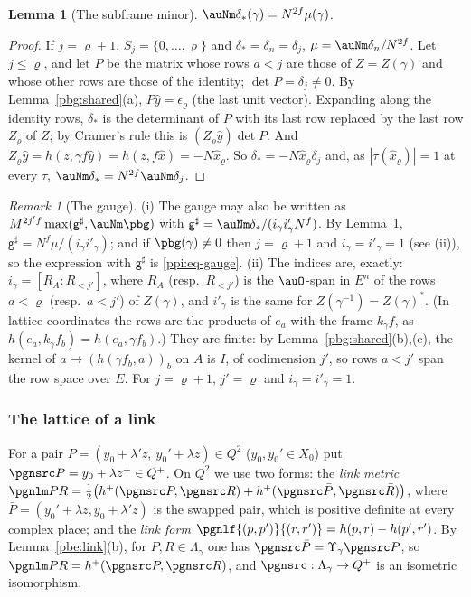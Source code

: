 \documentclass[10pt]{amsart}
\newtheorem{lemma}[theorem]{Lemma}
\theoremstyle{definition}
\theoremstyle{remark}
\newtheorem{remark}[theorem]{Remark}
\begin{document}
\begin{lemma}[The subframe minor]\label{pbg:subframe}
$\auNm\delta_*(\gamma)=N^{2f}\mu(\gamma)$.
\end{lemma}
\begin{proof}
If $j=\varrho+1$, $S_j=\{0,\dots,\varrho\}$ and $\delta_*=\delta_n=\delta_j$, $\mu=\auNm\delta_n/N^{2f}$.
Let $j\le\varrho$, and let $P$ be the matrix whose rows $a<j$ are those of $Z=Z(\gamma)$ and whose other
rows are those of the identity; $\det P=\delta_j\ne0$. By Lemma~\ref{pbg:shared}(a), $P\hat y=
\epsilon_\varrho$ (the last unit vector). Expanding along the identity rows, $\delta_*$ is the
determinant of $P$ with its last row replaced by the last row $Z_\varrho$ of $Z$; by Cramer's rule
this is $(Z_\varrho\hat y)\det P$. And $Z_\varrho\hat y=h(z,\gamma f\hat y)=h(z,f\hat x)=-N\hat x_\varrho$.
So $\delta_*=-N\hat x_\varrho\delta_j$ and, as $|\tau(\hat x_\varrho)|=1$ at every $\tau$, $\auNm\delta_*
=N^{2f}\auNm\delta_j$.
\end{proof}

\begin{remark}[The gauge]\label{pbg:rem-gauge}
(i) The gauge may also be written as $M^{2j'f}\max(\mathsf g^\sharp,\auNm\pbg)$ with $\mathsf g^\sharp=
\auNm\delta_*/(i_\gamma i'_\gamma N^f)$. By Lemma~\ref{pbg:subframe}, $\mathsf g^\sharp=N^f\mu/(i_\gamma
i'_\gamma)$; and if $\pbg(\gamma)\ne0$ then $j=\varrho+1$ and $i_\gamma=i'_\gamma=1$ (see (ii)), so the
expression with $\mathsf g^\sharp$ is \eqref{ppi:eq-gauge}. (ii) The indices are, exactly: $i_\gamma=[R_A:R_{<j'}]$, where
$R_A$ (resp.\ $R_{<j'}$) is the $\auO$-span in $E^n$ of the rows $a<\varrho$ (resp.\ $a<j'$) of
$Z(\gamma)$, and $i'_\gamma$ is the same for $Z(\gamma^{-1})=Z(\gamma)^*$. (In lattice coordinates the
rows are the products of $e_a$ with the frame $k_\gamma f$, as $h(e_a,k_\gamma f_b)=h(e_a,\gamma f_b)$.)
They are finite: by Lemma~\ref{pbg:shared}(b),(c), the kernel of $a\mapsto(h(\gamma f_b,a))_b$ on $A$ is
$I$, of codimension $j'$, so rows $a<j'$ span the row space over $E$. For $j=\varrho+1$, $j'=\varrho$
and $i_\gamma=i'_\gamma=1$.
\end{remark}

\subsubsection{The lattice of a link}\label{pbg:ss-link}

For a pair $P=(y_0+\lambda'z,\ y_0'+\lambda z)\in Q^2$ ($y_0,y_0'\in X_0$) put $\pgnsrc P=y_0+\lambda z^+
\in Q^+$. On $Q^2$ we use two forms: the \emph{link metric}
$\pgnlm PR=\tfrac12\bigl(h^+(\pgnsrc P,\pgnsrc R)+h^+(\pgnsrc\bar P,\pgnsrc\bar R)\bigr)$, where $\bar
P=(y_0'+\lambda z,y_0+\lambda'z)$ is the swapped pair, which is positive definite at every complex
place; and the \emph{link form} $\pgnlf{(p,p')}{(r,r')}=h(p,r)-h(p',r')$. By Lemma~\ref{pbe:link}(b),
for $P,R\in\Lambda_\gamma$ one has $\pgnsrc\bar P=\Upsilon_\gamma\pgnsrc P$, so $\pgnlm PR=h^+(\pgnsrc
P,\pgnsrc R)$, and $\pgnsrc:\Lambda_\gamma\to Q^+$ is an isometric isomorphism.
\end{document}
